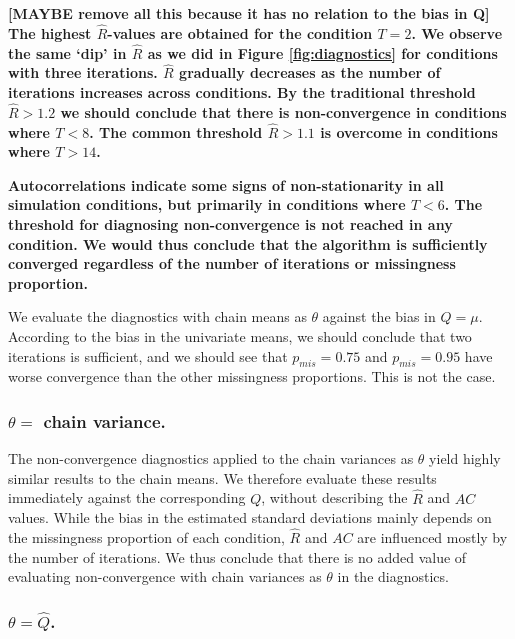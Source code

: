 \documentclass[Royal,times,sageh]{sagej}
\begin{document}
\textbf{{[}MAYBE remove all this because it has no relation to the bias in Q{]} The highest \(\widehat{R}\)-values are obtained for the condition \(T=2\). We observe the same `dip' in \(\widehat{R}\) as we did in Figure \ref{fig:diagnostics} for conditions with three iterations. \(\widehat{R}\) gradually decreases as the number of iterations increases across conditions. By the traditional threshold \(\widehat{R}>1.2\) we should conclude that there is non-convergence in conditions where \(T<8\). The common threshold \(\widehat{R}>1.1\) is overcome in conditions where \(T>14\). }

\textbf{Autocorrelations indicate some signs of non-stationarity in all simulation conditions, but primarily in conditions where \(T<6\). The threshold for diagnosing non-convergence is not reached in any condition. We would thus conclude that the algorithm is sufficiently converged regardless of the number of iterations or missingness proportion. }

We evaluate the diagnostics with chain means as \(\theta\) against the bias in \(Q=\mu\). According to the bias in the univariate means, we should conclude that two iterations is sufficient, and we should see that \(p_{mis}=0.75\) and \(p_{mis}=0.95\) have worse convergence than the other missingness proportions. This is not the case.

\hypertarget{theta-chain-variance.}{%
\subsubsection{\texorpdfstring{\(\theta=\) chain variance.}{\textbackslash theta= chain variance.}}\label{theta-chain-variance.}}

The non-convergence diagnostics applied to the chain variances as \(\theta\) yield highly similar results to the chain means. We therefore evaluate these results immediately against the corresponding \(Q\), without describing the \(\widehat{R}\) and \(AC\) values. While the bias in the estimated standard deviations mainly depends on the missingness proportion of each condition, \(\widehat{R}\) and \(AC\) are influenced mostly by the number of iterations. We thus conclude that there is no added value of evaluating non-convergence with chain variances as \(\theta\) in the diagnostics.

\hypertarget{thetahatq.}{%
\subsubsection{\texorpdfstring{\(\theta=\hat{Q}\).}{\textbackslash theta=\textbackslash hat\{Q\}.}}\label{thetahatq.}}
\end{document}
